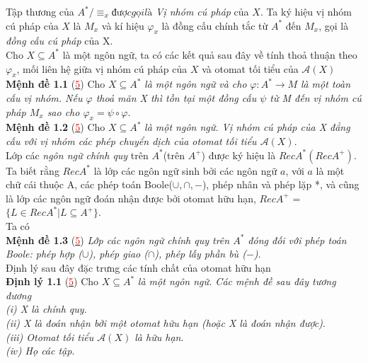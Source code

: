 \begin{flushleft}
\hspace{10mm}Tập thương của $A^*/ \equiv_x được gọi là$ \textit{Vị nhóm cú pháp} của $X$. Ta ký hiệu vị nhóm cú pháp của $X$ là $M_x$ và kí hiệu $\varphi_x$ là đồng cấu chính tắc từ $A^*$ đến $M_x$, gọi là \textit{đồng cấu cú pháp} của X.\\
\hspace{10mm}Cho $X \subseteq A^*$ là một ngôn ngữ, ta có các kết quả sau đây về tính thoả thuận theo $\varphi_x$, mối liên hệ giữa vị nhóm cú pháp của $X$ và otomat tối tiểu của $\mathcal{A}(X)$ \\
\textbf{Mệnh đề 1.1} (\hyperlink{page.80}{\textcolor{red}{5}})  Cho $X \subseteq A^*$ \textit{là một ngôn ngữ và cho} $\varphi : A^* \to M$ \textit{là một toàn cấu vị nhóm. Nếu $\varphi$ thoả mãn X thì tồn tại một đồng cấu $\psi$ từ M đến vị nhóm cú pháp $M_x$ sao cho $\varphi_x = \psi \circ \varphi$}. \\
\textbf{Mệnh đề 1.2} (\hyperlink{page.80}{\textcolor{red}{5}})  Cho $X \subseteq A^*$ \textit{là một ngôn ngữ. Vị nhóm cú pháp của X đẳng cấu với vị nhóm các phép chuyển dịch của otomat tối tiểu $\mathcal{A}(X)$}.\\
\hspace{10mm}Lớp các \textit{ngôn ngữ chính quy} trên $A^*$(trên $A^+$) được ký hiệu là $RecA^*(RecA^+)$. Ta biết rằng $RecA^*$ là lớp các ngôn ngữ sinh bởi các ngôn ngữ {$a$}, với $a$ là một chữ cái thuộc A, các phép toán Boole($\cup, \cap, - $), phép nhân và phép lặp *, và cũng là lớp các ngôn ngữ đoán nhận được bởi otomat hữu hạn, $RecA^+$ = $\{ L \in RecA^* | L \subseteq A^+ \}$. \\
Ta có\\
\textbf{Mệnh đề 1.3} (\hyperlink{page.80}{\textcolor{red}{5}})  \textit{Lớp các ngôn ngữ chính quy trên $A^*$ đóng đối với phép toán Boole: phép hợp ($\cup$), phép giao ($\cap$), phép lấy phần bù ($-$)}.\\
\hspace{10mm}Định lý sau đây đặc trưng các tính chất của otomat hữu hạn \\
\textbf{Định lý 1.1} (\hyperlink{page.80}{\textcolor{red}{5}})  Cho $X \subseteq A^*$ \textit{là một ngôn ngữ. Các mệnh đề sau đây tương đương}\\
\hspace{10mm}\textit{(i)    X là chính quy}.\\
\hspace{10mm}\textit{(ii)    X là đoán nhận bởi một otomat hữu hạn (hoặc X là đoán nhận được)}.\\
\hspace{10mm}\textit{(iii)    Otomat tối tiểu $\mathcal{A}(X)$ là hữu hạn}.\\
\hspace{10mm}\textit{(i$v$)    Họ các tập}.\\
\end{flushleft}
